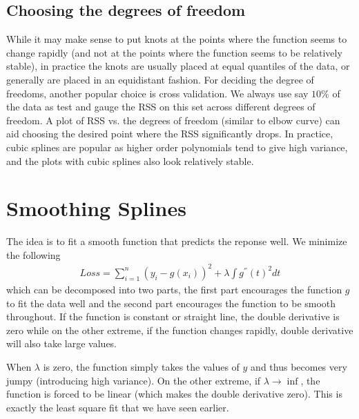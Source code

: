 \documentclass[../statistical_learning_notes.tex]{subfiles}
\begin{document}
    \subsection{Choosing the degrees of freedom}
    While it may make sense to put knots at the points where the function seems to change rapidly (and not at the points where the function seems to be relatively stable), in practice the knots are usually placed at equal quantiles of the data, or generally are placed in an equidistant fashion.\newline
    For deciding the degree of freedoms, another popular choice is cross validation. We always use say $10\%$ of the data as test and gauge the RSS on this set across different degrees of freedom. A plot of RSS vs. the degrees of freedom (similar to elbow curve) can aid choosing the desired point where the RSS significantly drops.\newline
    In practice, cubic splines are popular as higher order polynomials tend to give high variance, and the plots with cubic splines also look relatively stable.


    \section{Smoothing Splines}
    The idea is to fit a smooth function that predicts the reponse well. We minimize the following
    \begin{align*}
        Loss = \sum_{i=1}^{n} (y_{i} - g(x_{i}))^{2} + \lambda \int g^{''}(t)^{2}dt \tag*{$\lambda > 0$}
    \end{align*}
    which can be decomposed into two parts, the first part encourages the function $g$ to fit the data well and the second part encourages the function to be smooth throughout.\newline
    If the function is constant or straight line, the double derivative is zero while on the other extreme, if the function changes rapidly, double derivative will also take large values.\newline

    When $\lambda$ is zero, the function simply takes the values of $y$ and thus becomes very jumpy (introducing high variance). On the other extreme, if $\lambda \to \inf$, the function is forced to be linear (which makes the double derivative zero). This is exactly the least square fit that we have seen earlier.\newline
\end{document}
